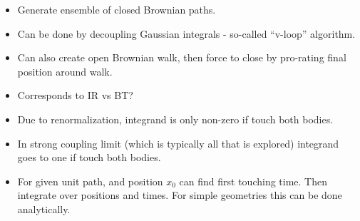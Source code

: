 \begin{itemize}
  \item Generate ensemble of closed Brownian paths.
  \item Can be done by decoupling Gaussian integrals - so-called ``v-loop'' algorithm.
  \item Can also create open Brownian walk, then force to close by pro-rating final position around walk.
  \item Corresponds to IR vs BT?

  \item Due to renormalization, integrand is only non-zero if touch both bodies.
  \item In strong coupling limit (which is typically all that is explored) integrand goes to one if touch
    both bodies.  
  \item For given unit path, and position $x_0$ can find first touching time.  Then integrate over 
    positions and times.  For simple geometries this can be done analytically.  
\end{itemize}


